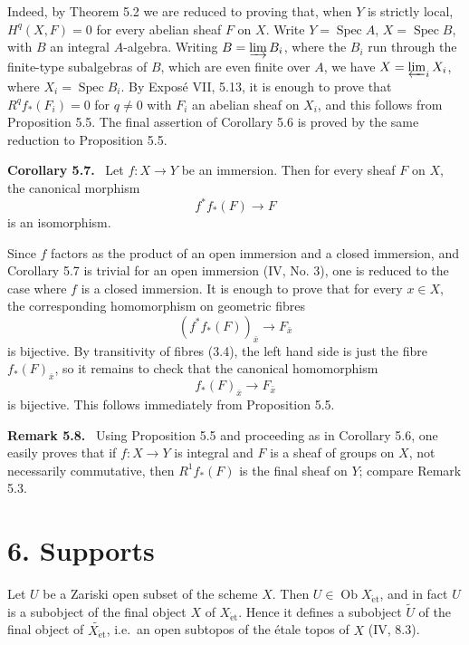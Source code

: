 \documentclass[11pt]{article}
\newcommand{\Spec}{\operatorname{Spec}}
\newcommand{\Ob}{\operatorname{Ob}}
\newcommand{\et}{\mathrm{\acute{e}t}}
\newcommand{\ie}{i.e.\ }
\newenvironment{statement}[1]{\par\medskip\noindent\textbf{#1.}\ }{\par\medskip}
\newenvironment{remarktext}[1]{\par\medskip\noindent\textbf{#1.}\ }{\par\medskip}
\begin{document}
Indeed, by Theorem 5.2 we are reduced to proving that, when \(Y\) is strictly local, \(H^q(X,F)=0\) for every abelian sheaf \(F\) on \(X\). Write \(Y=\Spec A\), \(X=\Spec B\), with \(B\) an integral \(A\)-algebra. Writing \(B=\varinjlim B_i\), where the \(B_i\) run through the finite-type subalgebras of \(B\), which are even finite over \(A\), we have \(X=\varprojlim_i X_i\), where \(X_i=\Spec B_i\). By Expos\'e VII, 5.13, it is enough to prove that \(R^qf_*(F_i)=0\) for \(q\ne 0\) with \(F_i\) an abelian sheaf on \(X_i\), and this follows from Proposition 5.5. The final assertion of Corollary 5.6 is proved by the same reduction to Proposition 5.5.

\begin{statement}{Corollary 5.7}
Let \(f:X\to Y\) be an immersion. Then for every sheaf \(F\) on \(X\), the canonical morphism
\[
f^*f_*(F)\longrightarrow F
\]
is an isomorphism.
\end{statement}

Since \(f\) factors as the product of an open immersion and a closed immersion, and Corollary 5.7 is trivial for an open immersion (IV, No. 3), one is reduced to the case where \(f\) is a closed immersion. It is enough to prove that for every \(x\in X\), the corresponding homomorphism on geometric fibres
\[
(f^*f_*(F))_{\bar x}\longrightarrow F_{\bar x}
\]
is bijective. By transitivity of fibres (3.4), the left hand side is just the fibre \(f_*(F)_{\bar x}\), so it remains to check that the canonical homomorphism
\[
f_*(F)_{\bar x}\longrightarrow F_{\bar x}
\]
is bijective. This follows immediately from Proposition 5.5.

\begin{remarktext}{Remark 5.8}
Using Proposition 5.5 and proceeding as in Corollary 5.6, one easily proves that if \(f:X\to Y\) is integral and \(F\) is a sheaf of groups on \(X\), not necessarily commutative, then \(R^1f_*(F)\) is the final sheaf on \(Y\); compare Remark 5.3.
\end{remarktext}

\section*{6. Supports}

Let \(U\) be a Zariski open subset of the scheme \(X\). Then \(U\in\Ob X_{\et}\), and in fact \(U\) is a subobject of the final object \(X\) of \(X_{\et}\). Hence it defines a subobject \(\widetilde U\) of the final object of \(\widetilde{X_{\et}}\), \ie an open subtopos of the \'etale topos of \(X\) (IV, 8.3).
\end{document}
